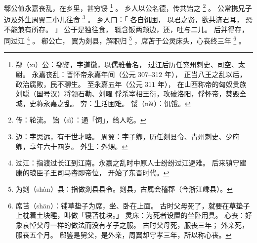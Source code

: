 
\switchcolumn*[\section{}]

郗公值永嘉丧乱，在乡里，甚穷馁%
\footnote{%
    郗（xī）公：郗鉴，字道徽，以儒雅著名，
                过江后历任兖州刺史、司空、太尉。
    永嘉丧乱：晋怀帝永嘉年间（公元 307--312 年），
              正当八王之乱以后，政治腐败，民不聊生。
              至永嘉五年（公元 311 年），
              在山西称帝的匈奴贵族刘聪（国号汉）将领石勒、刘曜
              俘杀宰相王衍，攻破洛阳，俘怀帝，焚毁全城，史称永嘉之乱。
    穷：生活困难。
    馁（něi）：饥饿。
}%
。
乡人以公名德，传共饴之%
\footnote{%
    传：轮流。
    饴（sì）：通「饲」，给人吃。
}%
。
公常携兄子迈及外生周翼二小儿往食%
\footnote{%
    迈：字思远，有干世才略。
    周翼：字子卿，历任剡县令、青州刺史、少府卿，享年六十四岁。
    外生：外甥。
}%
。
乡人曰：「
    各自饥困，
    以君之贤，欲共济君耳，
    恐不能兼有所存。
」
公于是独往食，
辄含饭两颊边，还，吐与二儿。
后并得存，同过江%
\footnote{%
    过江：指渡过长江到江南。永嘉之乱时中原人士纷纷过江避难。
          后来镇守建康的琅臣子王司马睿即帝位，
          开始了东晋时代。
}%
。
郗公亡，
翼为剡县，解职归%
\footnote{%
    为剡（shàn）县：指做剡县县令。剡县，古属会稽郡（今浙江嵊县）。
}%
，席苫于公灵床头，心丧终三年%
\footnote{%
    席苫（shān）：铺草垫子为席，坐、卧在上面。
                  古时父母死了，就要在草垫子上枕着土块睡，叫做「寝苫枕块。」
    灵床：为死者设置的坐卧用具。
    心丧：好象哀悼父母一样的做法而没有孝子之服。
          古时父母死，服丧三年；
          外亲死，服丧五个月。
          郗鉴是舅父，是外亲，周翼却守孝三年，所以称心丧。
}%
。

\switchcolumn


